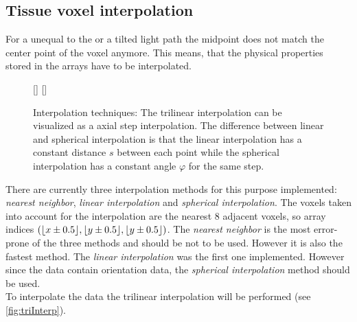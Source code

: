 \subsection{Tissue voxel interpolation}
%
For a \stepsize{} unequal to the \voxelsize{} or a tilted light path the midpoint does not match the center point of the voxel anymore.
This means, that the physical properties stored in the arrays have to be interpolated.
%
\begin{figure}[!t]
\centering
\setlength{\tikzwidth}{0.45\textwidth}
[\tikzwidth]{
\hfill{}\hfill}\hfill
{}[\tikzwidth]{
}
\caption[]{Interpolation techniques: The trilinear interpolation can be visualized as a axial step interpolation. The difference between linear and spherical interpolation is that the linear interpolation has a constant distance $s$ between each point while the spherical interpolation has a constant angle $\varphi$ for the same step.}
\label{fig:vectorfield_disc}
\end{figure}
%
There are currently three interpolation methods for this purpose implemented: \textit{nearest neighbor}, \textit{linear interpolation} and \textit{spherical interpolation}.
The voxels taken into account for the interpolation are the nearest 8 adjacent voxels, so array indices $(\lfloor x\pm0.5\rfloor,\lfloor y\pm0.5\rfloor,\lfloor y\pm0.5\rfloor)$.
%
The \textit{nearest neighbor} is the most error-prone of the three methods and should be not to be used.
However it is also the fastest method.
The \textit{linear interpolation} was the first one implemented.
However since the data contain orientation data, the \textit{spherical interpolation} method should be used.
\\
%
To interpolate the data the trilinear interpolation will be performed (see \cref{fig:triInterp}).
%
%
%
